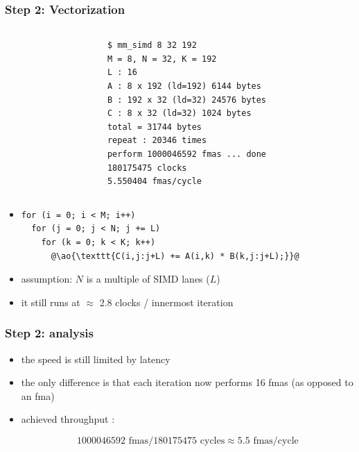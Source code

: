 \documentclass[12pt,dvipdfmx]{beamer}
\newcommand{\ao}[1]{{\color{blue}#1}}
\begin{document}
\begin{frame}[fragile]
\frametitle{Step 2: Vectorization}
\begin{columns}
  \begin{column}{0.55\textwidth}
\begin{center}
\def\svgwidth{0.8\textwidth}
%
%
\end{center}
  \end{column}
  \begin{column}{0.4\textwidth}
\begin{lstlisting}
$ mm_simd 8 32 192
M = 8, N = 32, K = 192
L : 16
A : 8 x 192 (ld=192) 6144 bytes
B : 192 x 32 (ld=32) 24576 bytes
C : 8 x 32 (ld=32) 1024 bytes
total = 31744 bytes
repeat : 20346 times
perform 1000046592 fmas ... done
180175475 clocks
5.550404 fmas/cycle
\end{lstlisting}%
  \end{column}
\end{columns}

\begin{itemize}
\item []
\begin{lstlisting}
for (i = 0; i < M; i++)  
  for (j = 0; j < N; j += L)
    for (k = 0; k < K; k++)  
      @\ao{\texttt{C(i,j:j+L) += A(i,k) * B(k,j:j+L);}}@
\end{lstlisting}
\end{itemize}

\begin{itemize}
\item assumption: $N$ is a multiple of SIMD lanes ($L$)
\item it still runs at $\approx$ 2.8 clocks / innermost iteration
\end{itemize}
\end{frame}

\begin{frame}[fragile]
\frametitle{Step 2: analysis}
\begin{itemize}
  
\item the speed is still limited by latency
\item the only difference is that each iteration now performs 16 fmas (as opposed to an fma)

\item achieved throughput :

  \[ 1000046592 \mbox{ fmas} / 180175475 \mbox{ cycles} \approx 5.5 \mbox{ fmas/cycle} \]
\end{itemize}
\end{frame}
\end{document}
